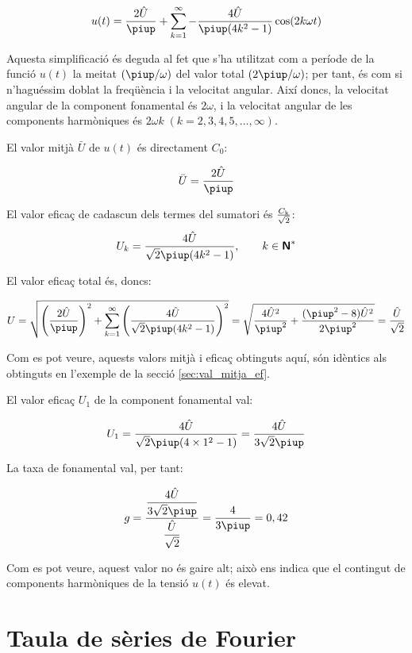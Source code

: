 \begin{exemple}[\ValorMitjaEfTaxaFon{}]
    \[
		u(t) = \frac{2\hat{U}}{\piup} + \sum_{k=1}^\infty - \frac{4\hat{U}}{\piup(4k^2-1)} \cos(2 k \omega t)
    \]

    Aquesta simplificació és deguda al fet que s'ha utilitzat com a
    període de la funció $u(t)$ la meitat $(\piup/\omega)$ del valor total
    $(2\piup/\omega)$; per tant, és com si n'haguéssim doblat la
    freqüència i la velocitat angular. Així doncs, la velocitat angular
    de la component fonamental és $2\omega$, i la velocitat angular de
    les components harmòniques és $2\omega k \;(k=2,3,4,5,\ldots,\infty)$.

    El valor mitjà $\bar{U}$ de $u(t)$ és directament $C_0$:

    \[
        \bar{U} = \frac{2\hat{U}}{\piup}
    \]

    El valor eficaç de cadascun dels termes del sumatori és $\frac{C_\mathrm{k}}{\sqrt{2}}$:
    \[
        U_k =  \frac{4\hat{U}}{\sqrt{2}\piup(4k^2-1)},
        \qquad k \in \mathsfb{N}^*
    \]

    El valor eficaç total és, doncs:

    \[
        U=\sqrt{\left(\frac{2\hat{U}}{\piup}\right)^2 + \sum_{k=1}^\infty
        \left( \frac{4\hat{U}}{\sqrt{2}\piup(4k^2-1)}\right)^2} =
        \sqrt{\frac{4\hat{U}^2}{\piup^2} + \frac{(\piup^2-8)\hat{U}^2}{2\piup^2}
        }= \frac{\hat{U}}{\sqrt{2}}
    \]

    Com es pot veure, aquests valors mitjà i eficaç obtinguts aquí, són
    idèntics als obtinguts en l'exemple de la secció
    \ref{sec:val_mitja_ef}.

    El valor eficaç $U_1$ de la component fonamental val:

    \[
        U_1 =\frac{4\hat{U}}{\sqrt{2}\piup(4\times 1^2-1)} =
        \frac{4\hat{U}}{3\sqrt{2}\piup}
    \]

    La taxa de fonamental val, per tant:

    \[
        g =
        \frac{\dfrac{4\hat{U}}{3\sqrt{2}\piup}}{\dfrac{\hat{U}}{\sqrt{2}}}
        =\frac{4}{3\piup} = 0,{42}
    \]

    Com es pot veure, aquest valor no és gaire alt; això ens indica que
    el contingut de components harmòniques de la tensió $u(t)$ és
    elevat.
\end{exemple}


\section{Taula de sèries de Fourier}

